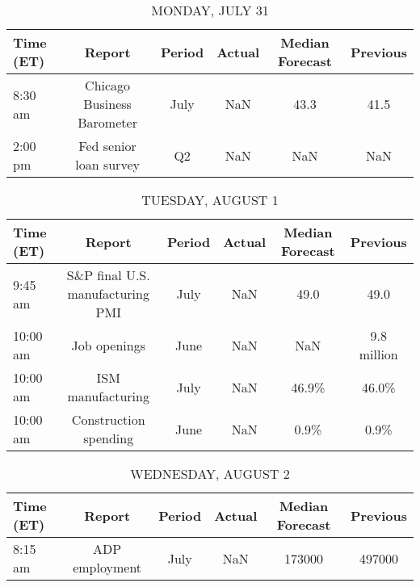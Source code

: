 \documentclass{article}%
\begin{document}
%
\normalsize%


\begin{table}[htbp]%
\caption{MONDAY, JULY 31}%
\centering%
\begin{adjustbox}{width=1\textwidth}%
\begin{tabular}{lccccc}
\toprule
Time (ET) &                     Report & Period & Actual & Median Forecast & Previous \\
\midrule
  8:30 am & Chicago Business Barometer &   July &    NaN &            43.3 &     41.5 \\
  2:00 pm &     Fed senior loan survey &     Q2 &    NaN &             NaN &      NaN \\
\bottomrule
\end{tabular}
%
\end{adjustbox}%
\end{table}

%


\begin{table}[htbp]%
\caption{TUESDAY, AUGUST 1}%
\centering%
\begin{adjustbox}{width=1\textwidth}%
\begin{tabular}{lccccc}
\toprule
Time (ET) &                           Report & Period & Actual & Median Forecast &    Previous \\
\midrule
  9:45 am & S\&P final U.S. manufacturing PMI &   July &    NaN &            49.0 &        49.0 \\
 10:00 am &                     Job openings &   June &    NaN &             NaN & 9.8 million \\
 10:00 am &                ISM manufacturing &   July &    NaN &           46.9\% &       46.0\% \\
 10:00 am &            Construction spending &   June &    NaN &            0.9\% &        0.9\% \\
\bottomrule
\end{tabular}
%
\end{adjustbox}%
\end{table}

%


\begin{table}[htbp]%
\caption{WEDNESDAY, AUGUST 2}%
\centering%
\begin{adjustbox}{width=1\textwidth}%
\begin{tabular}{lccccc}
\toprule
Time (ET) &         Report & Period & Actual & Median Forecast & Previous \\
\midrule
  8:15 am & ADP employment &   July &    NaN &          173000 &   497000 \\
\bottomrule
\end{tabular}
%
\end{adjustbox}%
\end{table}
\end{document}
